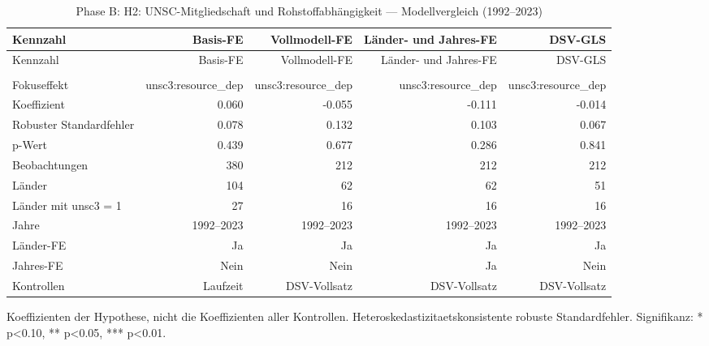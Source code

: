 \begingroup
\scriptsize
\setlength{\tabcolsep}{3pt}
\begin{landscape}
\begin{longtable}{>{\raggedright\arraybackslash}p{4.8cm} r r r r}
\caption{Phase B: H2: UNSC-Mitgliedschaft und Rohstoffabhängigkeit — Modellvergleich (1992–2023)}\label{tab:phase_b_h2_modellvergleich}\\
\toprule
Kennzahl & Basis-FE & Vollmodell-FE & Länder- und Jahres-FE & DSV-GLS
 \\
\midrule
\endfirsthead
\toprule
Kennzahl & Basis-FE & Vollmodell-FE & Länder- und Jahres-FE & DSV-GLS
 \\
\midrule
\endhead
\midrule
\multicolumn{5}{r}{Fortsetzung auf der naechsten Seite}\\
\endfoot
\bottomrule
\endlastfoot
Fokuseffekt & unsc3:resource\_dep & unsc3:resource\_dep & unsc3:resource\_dep & unsc3:resource\_dep \\
Koeffizient & 0.060 & -0.055 & -0.111 & -0.014 \\
Robuster Standardfehler & 0.078 & 0.132 & 0.103 & 0.067 \\
p-Wert & 0.439 & 0.677 & 0.286 & 0.841 \\
Beobachtungen & 380 & 212 & 212 & 212 \\
Länder & 104 & 62 & 62 & 51 \\
Länder mit unsc3 = 1 & 27 & 16 & 16 & 16 \\
Jahre & 1992--2023 & 1992--2023 & 1992--2023 & 1992--2023 \\
Länder-FE & Ja & Ja & Ja & Ja \\
Jahres-FE & Nein & Nein & Ja & Nein \\
Kontrollen & Laufzeit & DSV-Vollsatz & DSV-Vollsatz & DSV-Vollsatz \\
\end{longtable}
\noindent\footnotesize Koeffizienten der Hypothese, nicht die Koeffizienten aller Kontrollen. Heteroskedastizitaetskonsistente robuste Standardfehler. Signifikanz: * p<0.10, ** p<0.05, *** p<0.01.\par
\end{landscape}
\endgroup

